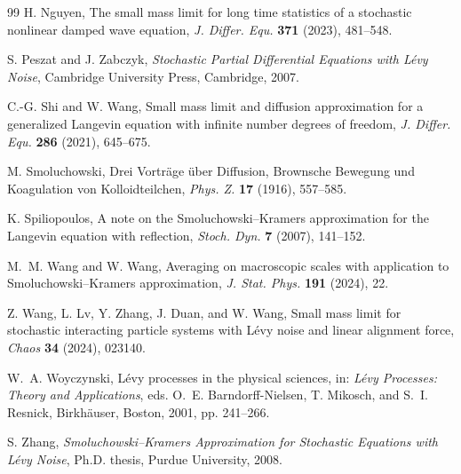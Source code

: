 \documentclass[11pt]{article}
\theoremstyle{plain}
\numberwithin{equation}{section}
\begin{document}
\begin{thebibliography}{99}
H. Nguyen,
The small mass limit for long time statistics of a stochastic nonlinear damped wave equation,
\emph{J. Differ. Equ.} \textbf{371} (2023), 481--548.

S. Peszat and J. Zabczyk,
\emph{Stochastic Partial Differential Equations with L\'evy Noise},
Cambridge University Press, Cambridge, 2007.

C.-G. Shi and W. Wang,
Small mass limit and diffusion approximation for a generalized Langevin equation with infinite number degrees of freedom,
\emph{J. Differ. Equ.} \textbf{286} (2021), 645--675.

 
 

M. Smoluchowski,
Drei Vortr\"age \"uber Diffusion, Brownsche Bewegung und Koagulation von Kolloidteilchen,
\emph{Phys. Z.} \textbf{17} (1916), 557--585.

K. Spiliopoulos,
A note on the Smoluchowski--Kramers approximation for the Langevin equation with reflection,
\emph{Stoch. Dyn.} \textbf{7} (2007), 141--152.

M.~M. Wang and W. Wang,
Averaging on macroscopic scales with application to Smoluchowski--Kramers approximation,
\emph{J. Stat. Phys.} \textbf{191} (2024), 22.

 
Z. Wang, L. Lv, Y. Zhang, J. Duan, and W. Wang,
Small mass limit for stochastic interacting particle systems with L\'evy noise and linear alignment force,
\emph{Chaos} \textbf{34} (2024), 023140.

 

W.~A. Woyczynski,
L\'evy processes in the physical sciences,
in: \emph{L\'evy Processes: Theory and Applications}, eds. O.~E. Barndorff-Nielsen, T. Mikosch, and S.~I. Resnick,
Birkh\"auser, Boston, 2001, pp. 241--266.

 

S. Zhang,
\emph{Smoluchowski--Kramers Approximation for Stochastic Equations with L\'evy Noise},
Ph.D. thesis, Purdue University, 2008.









 
\end{thebibliography}
\end{document}

